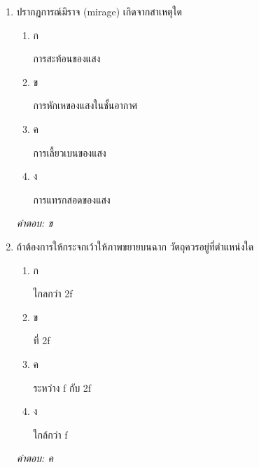\documentclass[12pt]{article}
\begin{document}
\begin{enumerate}[label=\arabic*., itemsep=0.5\baselineskip, topsep=0.5\baselineskip, leftmargin=*]
\item ปรากฏการณ์มิราจ (mirage) เกิดจากสาเหตุใด
\begin{enumerate}[label=\alph*)., itemsep=0.3\baselineskip, topsep=0.3\baselineskip]
\item ก\ 
\begin{minipage}[t]{0.9\linewidth}
\raggedright การสะท้อนของแสง
\end{minipage}
\item ข\ 
\begin{minipage}[t]{0.9\linewidth}
\raggedright การหักเหของแสงในชั้นอากาศ
\end{minipage}
\item ค\ 
\begin{minipage}[t]{0.9\linewidth}
\raggedright การเลี้ยวเบนของแสง
\end{minipage}
\item ง\ 
\begin{minipage}[t]{0.9\linewidth}
\raggedright การแทรกสอดของแสง
\end{minipage}
\end{enumerate}
\vspace{-0.3\baselineskip}
\begin{small}
\textit{คำตอบ: ข}
\end{small}

\item ถ้าต้องการให้กระจกเว้าให้ภาพขยายบนฉาก วัตถุควรอยู่ที่ตำแหน่งใด
\begin{enumerate}[label=\alph*)., itemsep=0.3\baselineskip, topsep=0.3\baselineskip]
\item ก\ 
\begin{minipage}[t]{0.9\linewidth}
\raggedright ไกลกว่า 2f
\end{minipage}
\item ข\ 
\begin{minipage}[t]{0.9\linewidth}
\raggedright ที่ 2f
\end{minipage}
\item ค\ 
\begin{minipage}[t]{0.9\linewidth}
\raggedright ระหว่าง f กับ 2f
\end{minipage}
\item ง\ 
\begin{minipage}[t]{0.9\linewidth}
\raggedright ใกล้กว่า f
\end{minipage}
\end{enumerate}
\vspace{-0.3\baselineskip}
\begin{small}
\textit{คำตอบ: ค}
\end{small}


\end{enumerate}
\end{document}
